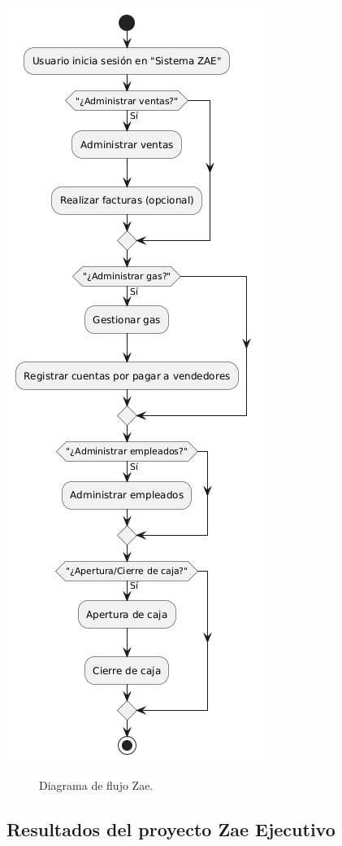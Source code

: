 \documentclass[protocolo.tex]{subfiles}
\begin{document}
\begin{center}
\includegraphics[scale=0.5]{Imagenes/zae.png}
\end{center}
\begin{figure}[h]  %
    \centering
    \caption{Diagrama de flujo Zae.}
    \label{fig:mi-figura6}
\end{figure}
\subsection{Resultados del proyecto Zae Ejecutivo}
\end{document}
